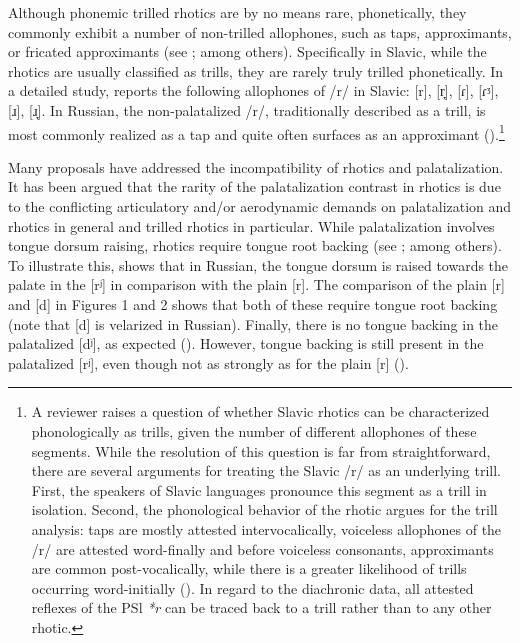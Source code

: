\documentclass[output=paper]{langscibook}
\begin{document}
Although phonemic trilled rhotics are by no means rare, phonetically, they commonly exhibit a number of non-trilled allophones, such as taps, approximants, or fricated approximants (see \citealt{Colantoni2006,Wiese2001,VerstraetenVelde2001,Solé2002,RecasensEspinosa2007,Żygis2005,JaworskiGillian2011}; among others). Specifically in Slavic, while the rhotics are usually classified as trills, they are rarely truly trilled phonetically. In a detailed study, \citet[113-120]{Jaworski2018} reports the following allophones of /r/ in Slavic: [r], [r̞], [ɾ], [ɾᶾ], [ɹ], [ɹ̞]. In Russian, the non-palatalized /r/, traditionally described as a trill, is most commonly realized as a tap and quite often surfaces as an approximant (\citealt{KavitskayaEtAl2009,IskarousKavitskaya2010,Jaworski2018}).\footnote{A reviewer raises a question of whether Slavic rhotics can be characterized phonologically as trills, given the number of different allophones of these segments. While the resolution of this question is far from straightforward, there are several arguments for treating the Slavic /r/ as an underlying trill. First, the speakers of Slavic languages pronounce this segment as a trill in isolation. Second, the phonological behavior of the rhotic argues for the trill analysis: taps are mostly attested intervocalically, voiceless allophones of the /r/ are attested word-finally and before voiceless consonants, approximants are common post-vocalically, while there is a greater likelihood of trills occurring word-initially (\citealt{IskarousKavitskaya2010}). In regard to the diachronic data, all attested reflexes of the PSl \textit{*r} can be traced back to a trill rather than to any other rhotic.}

Many proposals have addressed the incompatibility of rhotics and palatalization. It has been argued that the rarity of the palatalization contrast in rhotics is due to the conflicting articulatory and/or aerodynamic demands on palatalization and rhotics in general and trilled rhotics in particular. While palatalization involves tongue dorsum raising, rhotics require tongue root backing (see \citealt{Kochetov2005,Hall2000,IskarousKavitskaya2010,Jaworski2018}; among others). To illustrate this,  shows that in Russian, the tongue dorsum is raised towards the palate in the [rʲ] in comparison with the plain [r]. The comparison of the plain [r] and [d] in Figures 1 and 2 shows that both of these require tongue root backing (note that [d] is velarized in Russian). Finally, there is no tongue backing in the palatalized [dʲ], as expected (). However, tongue backing is still present in the palatalized [rʲ], even though not as strongly as for the plain [r] ().
\end{document}
